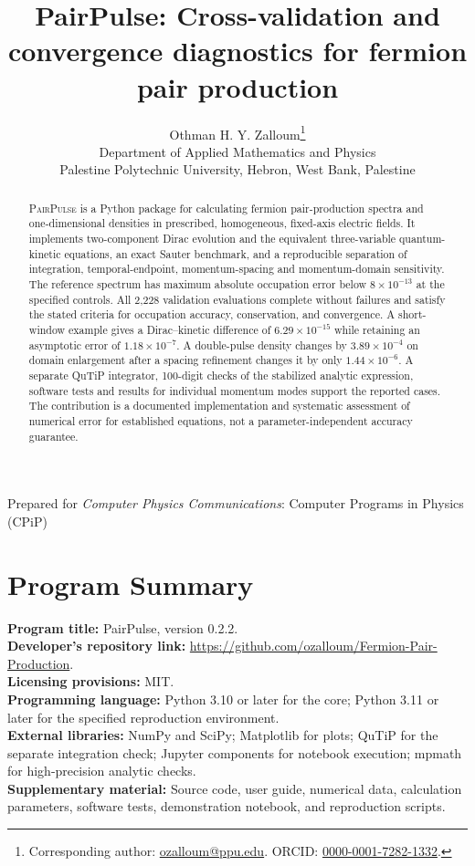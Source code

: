 \documentclass[11pt,a4paper]{article}
\title{PairPulse: Cross-validation and convergence diagnostics for fermion pair production}
\author{Othman H. Y. Zalloum\thanks{Corresponding author: \href{mailto:ozalloum@ppu.edu}{ozalloum@ppu.edu}. ORCID: \href{https://orcid.org/0000-0001-7282-1332}{0000-0001-7282-1332}.}\\[5pt]
\small Department of Applied Mathematics and Physics\\
\small Palestine Polytechnic University, Hebron, West Bank, Palestine}
\date{}
\newcommand{\PairPulse}{\textsc{PairPulse}}
\begin{document}
\maketitle
\begin{center}\small Prepared for \textit{Computer Physics Communications}: Computer Programs in Physics (CPiP)\end{center}
\begin{abstract}
\PairPulse{} is a Python package for calculating fermion pair-production spectra and one-dimensional densities in prescribed, homogeneous, fixed-axis electric fields. It implements two-component Dirac evolution and the equivalent three-variable quantum-kinetic equations, an exact Sauter benchmark, and a reproducible separation of integration, temporal-endpoint, momentum-spacing and momentum-domain sensitivity. The reference spectrum has maximum absolute occupation error below $8\times10^{-13}$ at the specified controls. All 2,228 validation evaluations complete without failures and satisfy the stated criteria for occupation accuracy, conservation, and convergence. A short-window example gives a Dirac--kinetic difference of $6.29\times10^{-15}$ while retaining an asymptotic error of $1.18\times10^{-7}$. A double-pulse density changes by $3.89\times10^{-4}$ on domain enlargement after a spacing refinement changes it by only $1.44\times10^{-6}$. A separate QuTiP integrator, 100-digit checks of the stabilized analytic expression, software tests and results for individual momentum modes support the reported cases. The contribution is a documented implementation and systematic assessment of numerical error for established equations, not a parameter-independent accuracy guarantee.
\end{abstract}

\section*{Program Summary}
\noindent\textbf{Program title:} PairPulse, version 0.2.2.\\
\textbf{Developer's repository link:} \url{https://github.com/ozalloum/Fermion-Pair-Production}.\\
\textbf{Licensing provisions:} MIT.\\
\textbf{Programming language:} Python 3.10 or later for the core; Python 3.11 or later for the specified reproduction environment.\\
\textbf{External libraries:} NumPy and SciPy; Matplotlib for plots; QuTiP for the separate integration check; Jupyter components for notebook execution; mpmath for high-precision analytic checks.\\
\textbf{Supplementary material:} Source code, user guide, numerical data, calculation parameters, software tests, demonstration notebook, and reproduction scripts.
\end{document}
